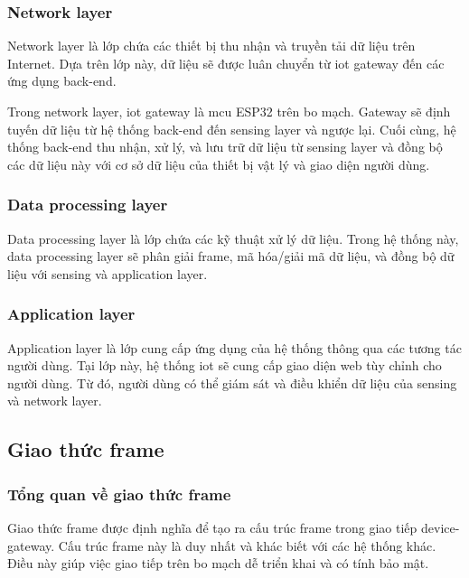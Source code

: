\subsubsection{Network layer}

Network layer là lớp chứa các thiết bị thu nhận và truyền tải dữ liệu trên Internet. Dựa trên lớp này, dữ liệu sẽ được luân chuyển từ \acrshort{iot} gateway đến các ứng dụng back-end.

Trong network layer, \acrshort{iot} gateway là \acrshort{mcu} ESP32 trên bo mạch. Gateway sẽ định tuyến dữ liệu từ hệ thống back-end đến sensing layer và ngược lại. Cuối cùng, hệ thống back-end thu nhận, xử lý, và lưu trữ dữ liệu từ sensing layer và đồng bộ các dữ liệu này với cơ sở dữ liệu của thiết bị vật lý và giao diện người dùng.

\subsubsection{Data processing layer}

Data processing layer là lớp chứa các kỹ thuật xử lý dữ liệu. Trong hệ thống này, data processing layer sẽ phân giải frame, mã hóa/giải mã dữ liệu, và đồng bộ dữ liệu với sensing và application layer.

\subsubsection{Application layer}

Application layer là lớp cung cấp ứng dụng của hệ thống thông qua các tương tác người dùng. Tại lớp này, hệ thống \acrshort{iot} sẽ cung cấp giao diện web tùy chỉnh cho người dùng. Từ đó, người dùng có thể giám sát và điều khiển dữ liệu của sensing và network layer.

\subsection{Giao thức frame}

\subsubsection{Tổng quan về giao thức frame}

Giao thức frame được định nghĩa để tạo ra cấu trúc frame trong giao tiếp device-gateway. Cấu trúc frame này là duy nhất và khác biết với các hệ thống khác. Điều này giúp việc giao tiếp trên bo mạch dễ triển khai và có tính bảo mật.

